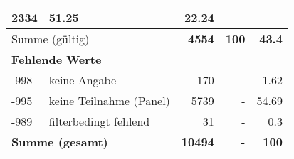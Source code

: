 \begin{longtable}{lXrrr}
       \num{2334} &
       \num[round-mode=places,round-precision=2]{51,25} &
         \num[round-mode=places,round-precision=2]{22,24} \\
     \midrule
     \multicolumn{2}{l}{Summe (gültig)} &
       \textbf{\num{4554}} &
     \textbf{100} &
       \textbf{\num[round-mode=places,round-precision=2]{43,4}} \\
     \multicolumn{5}{l}{\textbf{Fehlende Werte}}\\
       -998 &
       keine Angabe &
         \num{170} &
        - &
         \num[round-mode=places,round-precision=2]{1,62} \\
       -995 &
       keine Teilnahme (Panel) &
         \num{5739} &
        - &
         \num[round-mode=places,round-precision=2]{54,69} \\
       -989 &
       filterbedingt fehlend &
         \num{31} &
        - &
         \num[round-mode=places,round-precision=2]{0,3} \\
     \midrule
     \multicolumn{2}{l}{\textbf{Summe (gesamt)}} &
          \textbf{\num{10494}} &
        \textbf{-} &
        \textbf{100} \\
     \bottomrule
     \end{longtable}
     
